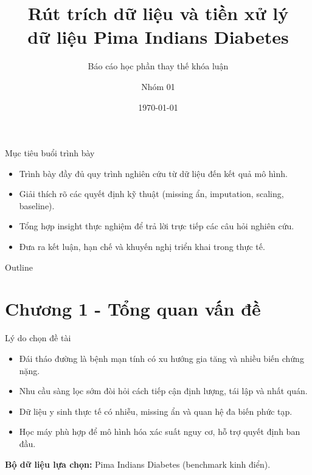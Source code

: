 \documentclass[10pt]{beamer}
\title{Rút trích dữ liệu và tiền xử lý\\dữ liệu Pima Indians Diabetes}
\subtitle{Báo cáo học phần thay thế khóa luận}
\author{Nhóm 01}
\institute{Khoa Toán Ứng dụng - Trường Đại học Sài Gòn}
\date{\today}
\begin{document}
\begin{frame}
  \titlepage
\end{frame}

\begin{frame}{Mục tiêu buổi trình bày}
  \begin{itemize}
    \item Trình bày đầy đủ quy trình nghiên cứu từ dữ liệu đến kết quả mô hình.
    \item Giải thích rõ các quyết định kỹ thuật (missing ẩn, imputation, scaling, baseline).
    \item Tổng hợp insight thực nghiệm để trả lời trực tiếp các câu hỏi nghiên cứu.
    \item Đưa ra kết luận, hạn chế và khuyến nghị triển khai trong thực tế.
  \end{itemize}
\end{frame}

\begin{frame}{Outline}
  \tableofcontents
\end{frame}

\section{Chương 1 - Tổng quan vấn đề}

\begin{frame}{Lý do chọn đề tài}
  \begin{itemize}
    \item Đái tháo đường là bệnh mạn tính có xu hướng gia tăng và nhiều biến chứng nặng.
    \item Nhu cầu sàng lọc sớm đòi hỏi cách tiếp cận định lượng, tái lập và nhất quán.
    \item Dữ liệu y sinh thực tế có nhiễu, missing ẩn và quan hệ đa biến phức tạp.
    \item Học máy phù hợp để mô hình hóa xác suất nguy cơ, hỗ trợ quyết định ban đầu.
  \end{itemize}
  \vspace{0.3em}
  \textbf{Bộ dữ liệu lựa chọn:} Pima Indians Diabetes (benchmark kinh điển).
\end{frame}
\end{document}
